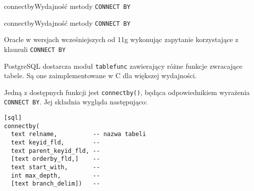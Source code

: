 



\begin{qxtab}{connectby}{Wydajność metody \texttt{CONNECT BY}}
\end{qxtab}

\begin{qxfig}{connectby}{Wydajność metody \texttt{CONNECT BY}}
\end{qxfig}


Oracle w wersjach wcześniejszych od 11g wykonując zapytanie korzystające z klauzuli \texttt{CONNECT BY}





PostgreSQL dostarcza moduł \texttt{tablefunc} zawierający różne funkcje zwracające tabele.
Są one zaimplementowane w C dla większej wydajności.

Jedną z dostępnych funkcji jest \texttt{connectby()}, będąca odpowiednikiem wyrażenia \texttt{CONNECT BY}. Jej składnia wygląda następująco:

\begin{verbatim}[sql]
connectby(
  text relname,          -- nazwa tabeli
  text keyid_fld,        -- 
  text parent_keyid_fld, -- 
  [text orderby_fld,]    -- 
  text start_with,       -- 
  int max_depth,         -- 
  [text branch_delim])   -- 
\end{verbatim}











